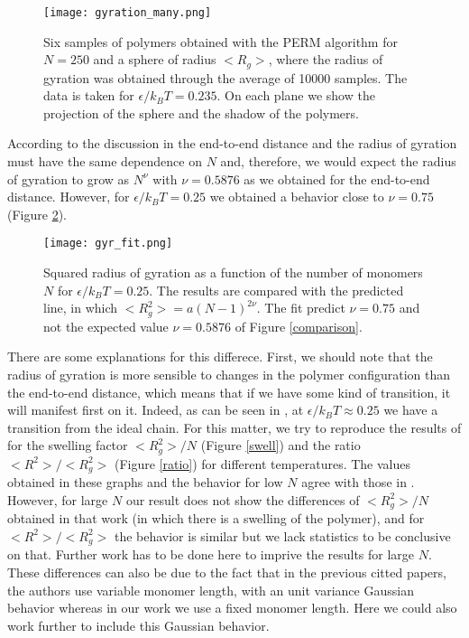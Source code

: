 \documentclass[aps,prl,reprint,groupedaddress]{revtex4-1}
\begin{document}
\begin{figure}[ht]
	\texttt{[image: gyration\_many.png]}
	\caption{Six samples of polymers obtained with the PERM algorithm for $N=250$ and a sphere of radius $<R_g>$, where the radius of gyration was obtained through the average of 10000 samples. The data is taken for $\epsilon/k_B T = 0.235$. On each plane we show the projection of the sphere and the shadow of the polymers. \label{gyration_idea}}
\end{figure}

According to the discussion in \cite{Smith1975} the end-to-end distance and the radius of gyration must have the same dependence on $N$ and, therefore, we would expect the radius of gyration to grow as $N^{\nu}$ with $\nu = 0.5876$ as we obtained for the end-to-end distance. However, for $\epsilon/k_B T = 0.25$ we obtained a behavior close to $\nu = 0.75$ (Figure \ref{gyr_fit}).

\begin{figure}[ht]
	\texttt{[image: gyr\_fit.png]}
	\caption{Squared radius of gyration as a function of the number of monomers $N$ for $\epsilon/k_B T = 0.25$. The results are compared with the predicted line, in which $<R_g^2> = a(N-1)^{2 \nu}$. The fit predict $\nu = 0.75$ and not the expected value $\nu = 0.5876$ of Figure \ref{comparison}. \label{gyr_fit}}
\end{figure}

There are some explanations for this differece. First, we should note that the radius of gyration is more sensible to changes in the polymer configuration than the end-to-end distance, which means that if we have some kind of transition, it will manifest first on it. Indeed, as can be seen in \cite{Witt1996}, at $\epsilon/k_B T \approx 0.25$ we have a transition from the ideal chain. For this matter, we try to reproduce the results of \cite{Grassberger1997} for the swelling factor $<R_g^2>/N$ (Figure \ref{swell}) and the ratio $<R^2>/<R_g^2>$ (Figure \ref{ratio}) for different temperatures. The values obtained in these graphs and the behavior for low $N$ agree with those in \cite{Grassberger1997}. However, for large $N$ our result does not show the differences of $<R_g^2>/N$ obtained in that work (in which there is a swelling of the polymer), and for $<R^2>/<R_g^2>$ the behavior is similar but we lack statistics to be conclusive on that. Further work has to be done here to imprive the results for large $N$. These differences can also be due to the fact that in the previous citted papers, the authors use variable monomer length, with an unit variance Gaussian behavior whereas in our work we use a fixed monomer length. Here we could also work further to include this Gaussian behavior. 
\end{document}

